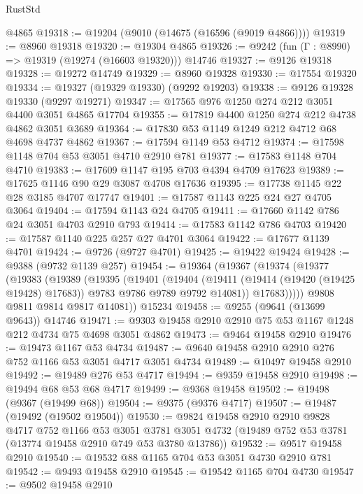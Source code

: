 \begin{lexlean}{RustStd}
\begin{coremodule}
    @4865
@19318 := @19204 (@9010 (@14675 (@16596 (@9019 @4866))))
@19319 := @8960 @19318
@19320 := @19304 @4865
@19326 := @9242 (fun (Γ : @8990) => @19319 (@19274 (@16603 @19320))) @14746
@19327 := @9126 @19318
@19328 := @19272 @14749
@19329 := @8960 @19328
@19330 := @17554 @19320
@19334 := @19327 (@19329 @19330) (@9292 @19203)
@19338 := @9126 @19328 @19330 (@9297 @19271)
@19347 := @17565 @976 @1250 @274 @212 @3051 @4400 @3051 @4865 @17704
@19355 := @17819 @4400 @1250 @274 @212 @4738 @4862 @3051 @3689
@19364 := @17830 @53 @1149 @1249 @212 @4712 @68 @4698 @4737 @4862
@19367 := @17594 @1149 @53 @4712
@19374 := @17598 @1148 @704 @53 @3051 @4710 @2910 @781
@19377 := @17583 @1148 @704 @4710
@19383 := @17609 @1147 @195 @703 @4394 @4709 @17623
@19389 := @17625 @1146 @90 @29 @3087 @4708 @17636
@19395 := @17738 @1145 @22 @28 @3185 @4707 @17747
@19401 := @17587 @1143 @225 @24 @27 @4705 @3064
@19404 := @17594 @1143 @24 @4705
@19411 := @17660 @1142 @786 @24 @3051 @4703 @2910 @793
@19414 := @17583 @1142 @786 @4703
@19420 := @17587 @1140 @225 @257 @27 @4701 @3064
@19422 := @17677 @1139 @4701
@19424 := @9726 (@9727 @4701)
@19425 := @19422 @19424
@19428 := @9388 (@9732 @1139 @257)
@19454 := @19364
    (@19367
      (@19374
        (@19377
          (@19383
            (@19389
              (@19395
                (@19401
                  (@19404
                    (@19411
                      (@19414 (@19420 (@19425 @19428) @17683))
                      @9783
                      @9786
                      @9789
                      @9792
                      @14081))
                  @17683)))))
        @9808
        @9811
        @9814
        @9817
        @14081))
    @15234
@19458 := @9255 (@9641 (@13699 @9643)) @14746
@19471 := @9303 @19458 @2910 @2910 @75 @53 @1167 @1248 @212 @4734 @75 @4698 @3051 @4862
@19473 := @9464 @19458 @2910
@19476 := @19473 @1167 @53 @4734
@19487 := @9640 @19458 @2910 @2910 @276 @752 @1166 @53 @3051 @4717 @3051 @4734
@19489 := @10497 @19458 @2910
@19492 := @19489 @276 @53 @4717
@19494 := @9359 @19458 @2910
@19498 := @19494 @68 @53 @68 @4717
@19499 := @9368 @19458
@19502 := @19498 (@9367 (@19499 @68))
@19504 := @9375 (@9376 @4717)
@19507 := @19487 (@19492 (@19502 @19504))
@19530 := @9824
    @19458
    @2910
    @2910
    @9828
    @4717
    @752
    @1166
    @53
    @3051
    @3781
    @3051
    @4732
    (@19489 @752 @53 @3781 (@13774 @19458 @2910 @749 @53 @3780 @13786))
@19532 := @9517 @19458 @2910
@19540 := @19532 @88 @1165 @704 @53 @3051 @4730 @2910 @781
@19542 := @9493 @19458 @2910
@19545 := @19542 @1165 @704 @4730
@19547 := @9502 @19458 @2910

\end{coremodule}
\end{lexlean}
